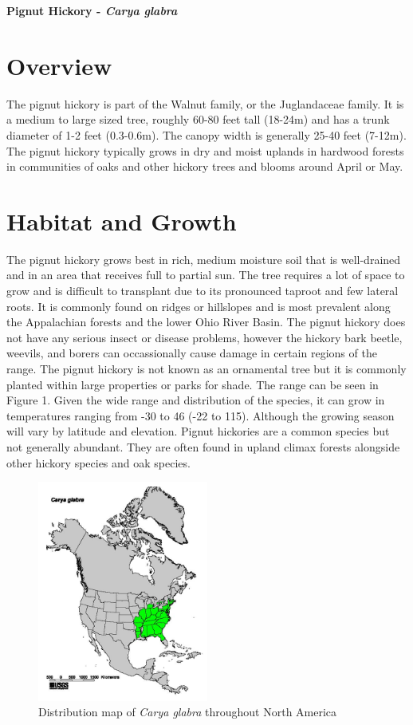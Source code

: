 \documentclass{article}\usepackage[]{graphicx}\usepackage[]{color}
\begin{document}
\renewcommand{\thetable}{\arabic{table}}
\renewcommand{\thefigure}{\arabic{figure}}
\renewcommand{\labelitemi}{$-$}
\begin{center}
{\huge\textbf{Pignut Hickory - {\textit{Carya glabra}}}}
\end{center}
\section*{Overview}
The pignut hickory is part of the Walnut family, or the Juglandaceae family. It is a medium to large sized tree, roughly 60-80 feet tall (18-24m) and has a trunk diameter of 1-2 feet (0.3-0.6m). The canopy width is generally 25-40 feet (7-12m). The pignut hickory typically grows in dry and moist uplands in hardwood forests in communities of oaks and other hickory trees and blooms around April or May. 
\section*{Habitat and Growth}
The pignut hickory grows best in rich, medium moisture soil that is well-drained and in an area that receives full to partial sun. The tree requires a lot of space to grow and is difficult to transplant due to its pronounced taproot and few lateral roots. It is commonly found on ridges or hillslopes and is most prevalent along the Appalachian forests and the lower Ohio River Basin. The pignut hickory does not have any serious insect or disease problems, however the hickory bark beetle, weevils,  and borers can occassionally cause damage in certain regions of the range. The pignut hickory is not known as an ornamental tree but it is commonly planted within large properties or parks for shade. The range can be seen in Figure 1. Given the wide range and distribution of the species, it can grow in temperatures ranging from -30 to 46 (-22 to 115). Although the growing season will vary by latitude and elevation. Pignut hickories are a common species but not generally abundant. They are often found in upland climax forests alongside other hickory species and oak species. 
\begin{figure}[ht]
\includegraphics[width=0.5\textwidth]{Carya_glabra_range_map.jpg}
\centering
\caption{Distribution map of \textit{Carya glabra} throughout North America}
\end{figure}
\newpage
\end{document}
